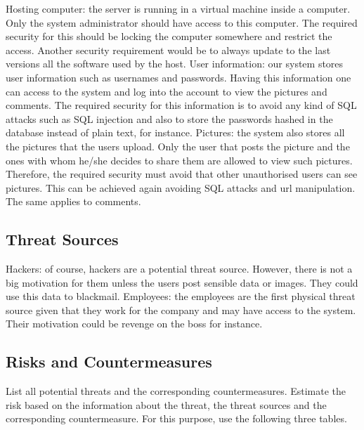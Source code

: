 \documentclass{article}
\begin{document}
Hosting computer: the server is running in a virtual machine inside a computer. Only the system administrator should have access to this computer. The required security for this should be locking the computer somewhere and restrict the access. Another security requirement would be to always update to the last versions all the software used by the host.
\newline
\newline
User information: our system stores user information such as usernames and passwords. Having this information one can access to the system and log into the account to view the pictures and comments. The required security for this information is to avoid any kind of SQL attacks such as SQL injection and also to store the passwords hashed in the database instead of plain text, for instance.
\newline
\newline
Pictures: the system also stores all the pictures that the users upload. Only the user that posts the picture and the ones with whom he/she decides to share them are allowed to view such pictures. Therefore, the required security must avoid that other unauthorised users can see pictures. This can be achieved again avoiding SQL attacks and url manipulation. The same applies to comments.

\subsection{Threat Sources}
Hackers: of course, hackers are a potential threat source. However, there is not a big motivation for them unless the users post sensible data or images. They could use this data to blackmail.
\newline
\newline
Employees: the employees are the first physical threat source given that they work for the company and may have access to the system. Their motivation could be revenge on the boss for instance.

\subsection{Risks and Countermeasures}

List all potential threats and the
  corresponding countermeasures. Estimate the risk based on 
  the information about the threat, the threat sources and the 
  corresponding countermeasure. For this purpose, use the following three
  tables.
\end{document}
